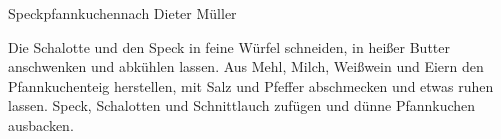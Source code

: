 \begin{recipe}{Speckpfannkuchen}{nach Dieter Müller}
  \label{Pfannkuchen}
  \inglist

  \steps
  Die Schalotte und den Speck in feine Würfel schneiden, in heißer Butter anschwenken und
  abkühlen lassen. Aus Mehl, Milch, Weißwein und Eiern den Pfannkuchenteig herstellen, mit
  Salz und Pfeffer abschmecken und etwas ruhen lassen. Speck, Schalotten und Schnittlauch
  zufügen und dünne Pfannkuchen ausbacken.
\end{recipe}
